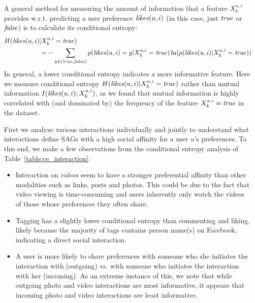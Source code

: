 A general method for measuring the amount of information that a 
feature $X^{u,i}_k$ provides w.r.t. predicting a user preference $\likes(u,i)$ (in this
case, just $\true$ or $\false$) is to calculate its conditional entropy:
\begin{align*}
H(\likes(u,i) &| X^{u,i}_k=\true)\\
& = -\sum_{y\in{(\true,\false)}} p(\likes(u,i)=y|X^{u,i}_k=\true) \ln( p(\likes(u,i)|X^{u,i}_k=\true))
\end{align*}
In general, a lower conditional entropy indicates a more informative
feature. Here we measure conditional entropy $H(\likes(u,i)| X^{u,i}_k=\true)$
rather than mutual information $I(\likes(u,i); X^{u,i}_k)$, as we found 
that mutual information is highly correlated with (and dominated by) the 
frequency of the feature $X^{u,i}_k=\true$ in the dataset.

First we analyze various interactions individually and jointly to understand what
interactions define SAGs with a high social affinity for a user $u$'s
preferences.  To this end, we make a few observations from the
conditional entropy analysis of Table~\ref{table:ce_interaction}:
\begin{itemize}
\item Interaction on {\em videos} seem to have a stronger preferential affinity 
than other modalities such as links, posts and photos.  This could be
  due to the fact that video viewing is time-consuming and users
  inherently only watch the videos of those whose preferences they
  often share.
\item Tagging has a slightly lower conditional entropy than
  commenting and liking, likely because the majority of tags contains 
  person name(s) on Facebook, indicating a direct social interaction. 
\item A user is more likely to share preferences with someone who she
  initiates the interaction with (outgoing) vs. with someone who
  initiates the interaction with her (incoming).  As an extreme
  instance of this, we note that while outgoing photo and video
  interactions are most informative, it appears that incoming photo
  and video interactions are least informative.
\end{itemize}


